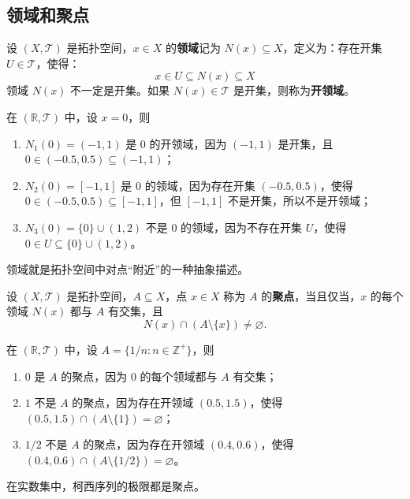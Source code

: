 \vspace{1em}
\subsection{领域和聚点}

\begin{definition}[领域 Neighborhood]
    设 $(X,\mathcal{T})$ 是拓扑空间，$x\in X$ 的\textbf{领域}记为 $N(x)\subseteq X$，定义为：存在开集 $U\in\mathcal{T}$，使得：
    \[
        x\in U \subseteq N(x) \subseteq X
    \]
    领域 $N(x)$ 不一定是开集。如果 $N(x)\in\mathcal{T}$ 是开集，则称为\textbf{开领域}。
    \label{def:neighborhood}
\end{definition}
\begin{example}
    在 $(\mathbb{R},\mathcal{T})$ 中，设 $x=0$，则
    \begin{enumerate}
        \item $N_1(0)=(-1,1)$ 是 $0$ 的开领域，因为 $(-1,1)$ 是开集，且 $0\in(-0.5,0.5)\subseteq(-1,1)$；
        \item $N_2(0)=[-1,1]$ 是 $0$ 的领域，因为存在开集 $(-0.5,0.5)$，使得 $0\in(-0.5,0.5)\subseteq[-1,1]$，但 $[-1,1]$ 不是开集，所以不是开领域；
        \item $N_3(0)=\{0\}\cup(1,2)$ 不是 $0$ 的领域，因为不存在开集 $U$，使得 $0\in U \subseteq \{0\}\cup(1,2)$。
    \end{enumerate}
\end{example}

\begin{note}
    领域就是拓扑空间中对点“附近”的一种抽象描述。
\end{note}
\vspace{1em}

\begin{definition}
    设 $(X,\mathcal{T})$ 是拓扑空间，$A\subseteq X$，点 $x\in X$ 称为 $A$ 的\textbf{聚点}，当且仅当，$x$ 的每个领域 $N(x)$ 都与 $A$ 有交集，且
    \[
        N(x) \cap (A\setminus\{x\}) \neq \varnothing.
    \]
    \label{def:accumulation_point}
\end{definition}

\begin{example}
    在 $(\mathbb{R},\mathcal{T})$ 中，设 $A=\{1/n:n\in\mathbb{Z}^+\}$，则
    \begin{enumerate}
        \item $0$ 是 $A$ 的聚点，因为 $0$ 的每个领域都与 $A$ 有交集；
        \item $1$ 不是 $A$ 的聚点，因为存在开领域 $(0.5,1.5)$，使得 $(0.5,1.5)\cap (A\setminus\{1\})=\varnothing$；
        \item $1/2$ 不是 $A$ 的聚点，因为存在开领域 $(0.4,0.6)$，使得 $(0.4,0.6)\cap (A\setminus\{1/2\})=\varnothing$。
    \end{enumerate}
    在实数集中，柯西序列的极限都是聚点。
\end{example}

